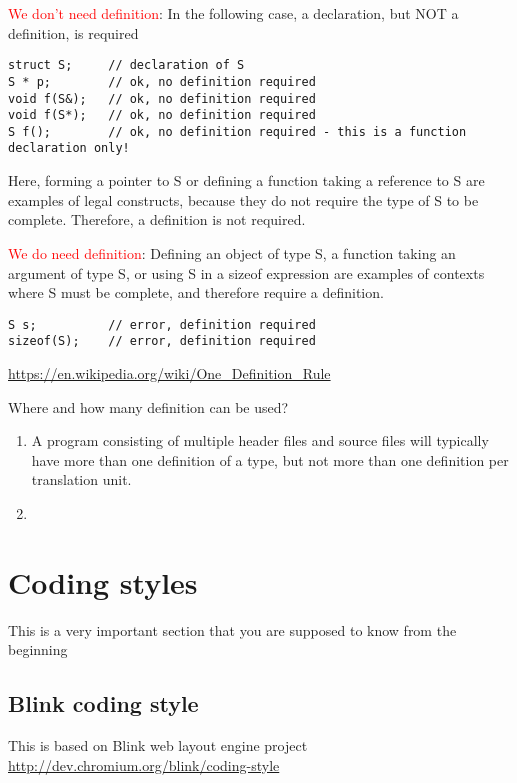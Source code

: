 \textcolor{red}{We don't need definition}: In the following case, a declaration, but NOT a definition, is required
\begin{verbatim}
struct S;     // declaration of S
S * p;        // ok, no definition required
void f(S&);   // ok, no definition required
void f(S*);   // ok, no definition required 
S f();        // ok, no definition required - this is a function declaration only!
\end{verbatim}
Here, forming a pointer to S or defining a function taking a
reference to S are examples of legal constructs, because they do not require the
type of S to be complete. Therefore, a definition is not required.

\textcolor{red}{We do need definition}: Defining an object of type S, a function
taking an argument of type S, or using S in a sizeof expression are examples of
contexts where S must be complete, and therefore require a definition.

\begin{verbatim}
S s;          // error, definition required
sizeof(S);    // error, definition required

\end{verbatim}

 \url{https://en.wikipedia.org/wiki/One_Definition_Rule}

Where and how many definition can be used?
\begin{enumerate}
  \item  
  
A program consisting of multiple header files and source files will typically
have more than one definition of a type, but not more than one definition per
translation unit.

  \item 
\end{enumerate}

\section{Coding styles}
\label{sec:coding_style-C/C++}

This is a very important section that you are supposed to know from the
beginning

\subsection{Blink coding style}

This is based on Blink web layout engine project
\url{http://dev.chromium.org/blink/coding-style}


